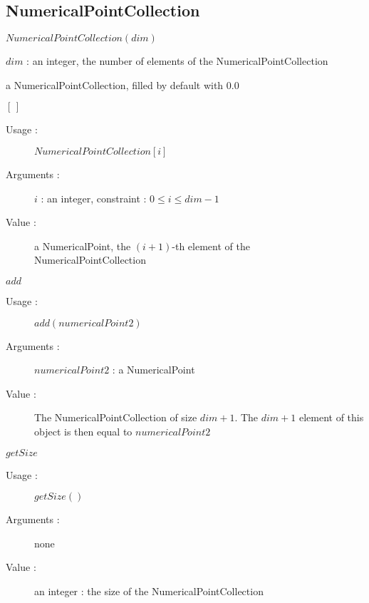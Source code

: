 


\newpage \subsection{NumericalPointCollection}

\begin{description}

\item[Usage :] \rule{0pt}{1em}$NumericalPointCollection(dim)$

\item[Arguments :]  $dim$ : an integer, the number of elements of the NumericalPointCollection

\item[Value :] a NumericalPointCollection, filled by default with 0.0

\item[Some methods :]  \rule{0pt}{1em}

  \begin{description}

  \item $[\,]$
    \begin{description}
    \item[Usage :] $NumericalPointCollection[i]$
    \item[Arguments :] $i$ : an integer, constraint : $0\leq i \leq dim-1$
    \item[Value :] a NumericalPoint, the $(i+1)$-th element of the NumericalPointCollection
    \end{description}
    \bigskip

  \item $add$
    \begin{description}
    \item[Usage :] $add(numericalPoint2)$
    \item[Arguments :] $numericalPoint2$ : a NumericalPoint
    \item[Value :] The NumericalPointCollection of size $dim+1$.
      The $dim+1$ element of this object is then equal to $numericalPoint2$
    \end{description}
    \bigskip

  \item $getSize$
    \begin{description}
    \item[Usage :] $getSize()$
    \item[Arguments :] none
    \item[Value :] an integer : the size of the NumericalPointCollection
    \end{description}
    \bigskip


  \end{description}
\end{description}




